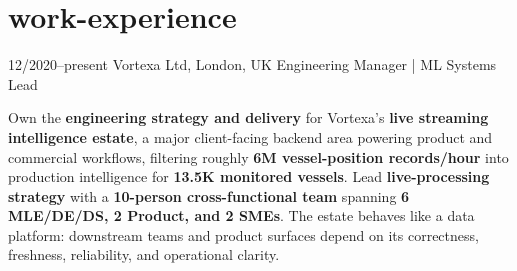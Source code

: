 \documentclass[]{../../../../friggeri-cv}
\begin{document}
\section{work-experience}
\begin{entrylist}
    \entry
    {12/2020--present}
    {Vortexa Ltd, London, UK}
        {Engineering Manager | ML Systems Lead}
    {
        {\small
        \setlength{\parindent}{0pt}
        \setlength{\leftskip}{0pt}
                                    Own the \textbf{engineering strategy and delivery} for Vortexa's \textbf{live streaming intelligence estate}, a major client-facing backend area powering product and commercial workflows, filtering roughly \textbf{6M vessel-position records/hour} into production intelligence for \textbf{13.5K monitored vessels}. Lead \textbf{live-processing strategy} with a \textbf{10-person cross-functional team} spanning \textbf{6 MLE/DE/DS, 2 Product, and 2 SMEs}. The estate behaves like a data platform: downstream teams and product surfaces depend on its correctness, freshness, reliability, and operational clarity.

}}
\end{entrylist}
\end{document}
